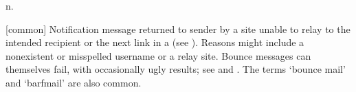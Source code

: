  n.

[common] Notification message returned to sender by a site unable to relay
 to the intended  recipient or the
next link in a  (see ). Reasons might
include a nonexistent or misspelled username or a  relay site.
Bounce messages can themselves fail, with occasionally ugly results; see
 and . The terms
`bounce mail' and `barfmail' are also common.

